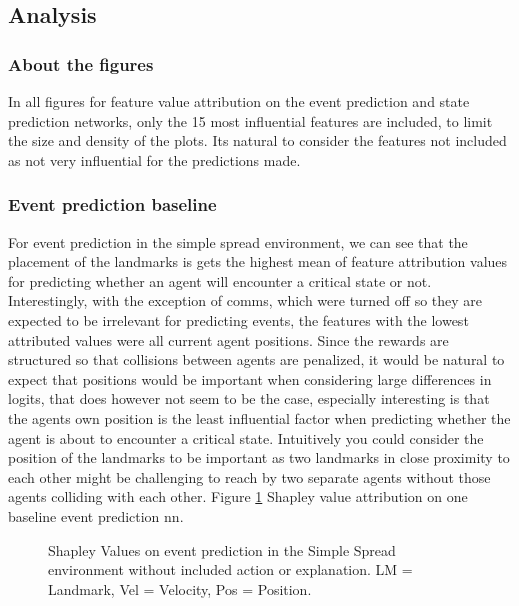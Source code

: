 \documentclass[UKenglish]{uiomasterthesis}
\begin{document}
\subsection{Analysis}
\subsubsection{About the figures}
In all figures for feature value attribution on the event prediction and state prediction networks, only the 15 most influential features are included, to limit the size and density of the plots. Its natural to consider the features not included as not very influential for the predictions made.


\subsubsection{Event prediction baseline}
For event prediction in the simple spread environment, we can see that the placement of the landmarks is gets the highest mean of feature attribution values for predicting whether an agent will encounter a critical state or not. Interestingly, with the exception of comms, which were turned off so they are expected to be irrelevant for predicting events, the features with the lowest attributed values were all current agent positions. Since the rewards are structured so that collisions between agents are penalized, it would be natural to expect that positions would be important when considering large differences in logits, that does however not seem to be the case, especially interesting is that the agents own position is the least influential factor when predicting whether the agent is about to encounter a critical state. Intuitively you could consider the position of the landmarks to be important as two landmarks in close proximity to each other might be challenging to reach by two separate agents without those agents colliding with each other. Figure \ref{fig:event_simpl_shap} Shapley value attribution on one baseline event prediction \ac{nn}.

\begin{center}
\begin{figure}[h]
\label{fig:event_simpl_shap}

\caption{Shapley Values on event prediction in the Simple Spread environment without included action or explanation. LM = Landmark, Vel = Velocity, Pos = Position.}
\end{figure}
\end{center}
\end{document}

